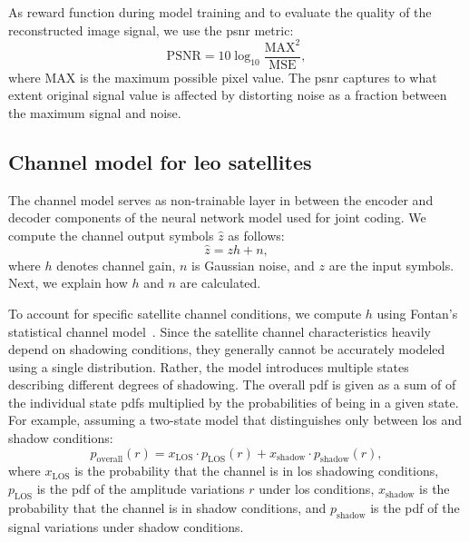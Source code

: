 \documentclass[conference]{IEEEtran}
\begin{document}
As reward function during model training and to evaluate the quality of the reconstructed image signal, we use the \ac{psnr} metric:
%
\begin{equation}
  \mathrm{PSNR} = 10 \log_{10}\frac{\mathrm{MAX}^2}{\mathrm{MSE}},
\end{equation}
%
where $\mathrm{MAX}$ is the maximum possible pixel value.
The \ac{psnr} captures to what extent original signal value is affected by distorting noise as a fraction between the maximum signal and noise.


\subsection{Channel model for \ac{leo} satellites}
\label{sub:channel_model}

The channel model serves as non-trainable layer in between the encoder and decoder components of the neural network model used for joint coding.
We compute the channel output symbols $\hat{z}$ as follows:
\begin{equation}
  \hat{z} = zh + n,
\end{equation}
where $h$ denotes channel gain, $n$ is Gaussian noise, and $z$ are the input symbols.
Next, we explain how $h$ and $n$ are calculated.

To account for specific satellite channel conditions, we compute $h$ using Fontan's statistical channel model~\cite{966585}. 
Since the satellite channel characteristics heavily depend on shadowing conditions, 
they generally cannot be accurately modeled using a single distribution.
Rather, the model introduces multiple states describing different degrees of shadowing. 
The overall \ac{pdf} is given as a sum of of the individual state \acp{pdf} multiplied by the probabilities of being in a given state.
For example, assuming a two-state model that distinguishes only between \ac{los} and shadow conditions: 
%
\begin{equation}
p_{\mathrm{overall}}(r) = x_{\mathrm{LOS}} \cdot p_{\mathrm{LOS}}(r)
  + x_{\mathrm{shadow}} \cdot p_{\mathrm{shadow}}(r),
\end{equation}
%
where $x_{\mathrm{LOS}}$ is the probability that the channel is in \ac{los} shadowing conditions, $p_{\mathrm{LOS}}$ is the \ac{pdf} of the amplitude variations $r$ under \ac{los} conditions, $x_{\mathrm{shadow}}$ is the probability that the channel is in shadow conditions, and $p_{\mathrm{shadow}}$ is the \ac{pdf} of the signal variations under shadow conditions.
\end{document}
